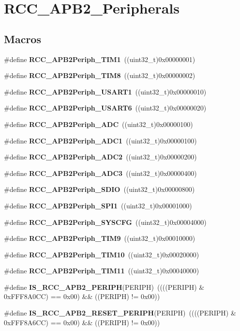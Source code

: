 \section{R\+C\+C\+\_\+\+A\+P\+B2\+\_\+\+Peripherals}
\label{group__RCC__APB2__Peripherals}
\subsection*{Macros}
\begin{DoxyCompactItemize}
\item 
\#define \textbf{ R\+C\+C\+\_\+\+A\+P\+B2\+Periph\+\_\+\+T\+I\+M1}~((uint32\+\_\+t)0x00000001)
\item 
\#define \textbf{ R\+C\+C\+\_\+\+A\+P\+B2\+Periph\+\_\+\+T\+I\+M8}~((uint32\+\_\+t)0x00000002)
\item 
\#define \textbf{ R\+C\+C\+\_\+\+A\+P\+B2\+Periph\+\_\+\+U\+S\+A\+R\+T1}~((uint32\+\_\+t)0x00000010)
\item 
\#define \textbf{ R\+C\+C\+\_\+\+A\+P\+B2\+Periph\+\_\+\+U\+S\+A\+R\+T6}~((uint32\+\_\+t)0x00000020)
\item 
\#define \textbf{ R\+C\+C\+\_\+\+A\+P\+B2\+Periph\+\_\+\+A\+DC}~((uint32\+\_\+t)0x00000100)
\item 
\#define \textbf{ R\+C\+C\+\_\+\+A\+P\+B2\+Periph\+\_\+\+A\+D\+C1}~((uint32\+\_\+t)0x00000100)
\item 
\#define \textbf{ R\+C\+C\+\_\+\+A\+P\+B2\+Periph\+\_\+\+A\+D\+C2}~((uint32\+\_\+t)0x00000200)
\item 
\#define \textbf{ R\+C\+C\+\_\+\+A\+P\+B2\+Periph\+\_\+\+A\+D\+C3}~((uint32\+\_\+t)0x00000400)
\item 
\#define \textbf{ R\+C\+C\+\_\+\+A\+P\+B2\+Periph\+\_\+\+S\+D\+IO}~((uint32\+\_\+t)0x00000800)
\item 
\#define \textbf{ R\+C\+C\+\_\+\+A\+P\+B2\+Periph\+\_\+\+S\+P\+I1}~((uint32\+\_\+t)0x00001000)
\item 
\#define \textbf{ R\+C\+C\+\_\+\+A\+P\+B2\+Periph\+\_\+\+S\+Y\+S\+C\+FG}~((uint32\+\_\+t)0x00004000)
\item 
\#define \textbf{ R\+C\+C\+\_\+\+A\+P\+B2\+Periph\+\_\+\+T\+I\+M9}~((uint32\+\_\+t)0x00010000)
\item 
\#define \textbf{ R\+C\+C\+\_\+\+A\+P\+B2\+Periph\+\_\+\+T\+I\+M10}~((uint32\+\_\+t)0x00020000)
\item 
\#define \textbf{ R\+C\+C\+\_\+\+A\+P\+B2\+Periph\+\_\+\+T\+I\+M11}~((uint32\+\_\+t)0x00040000)
\item 
\#define \textbf{ I\+S\+\_\+\+R\+C\+C\+\_\+\+A\+P\+B2\+\_\+\+P\+E\+R\+I\+PH}(P\+E\+R\+I\+PH)~((((P\+E\+R\+I\+PH) \& 0x\+F\+F\+F8\+A0\+C\+C) == 0x00) \&\& ((\+P\+E\+R\+I\+P\+H) != 0x00))
\item 
\#define \textbf{ I\+S\+\_\+\+R\+C\+C\+\_\+\+A\+P\+B2\+\_\+\+R\+E\+S\+E\+T\+\_\+\+P\+E\+R\+I\+PH}(P\+E\+R\+I\+PH)~((((P\+E\+R\+I\+PH) \& 0x\+F\+F\+F8\+A6\+C\+C) == 0x00) \&\& ((\+P\+E\+R\+I\+P\+H) != 0x00))
\end{DoxyCompactItemize}



